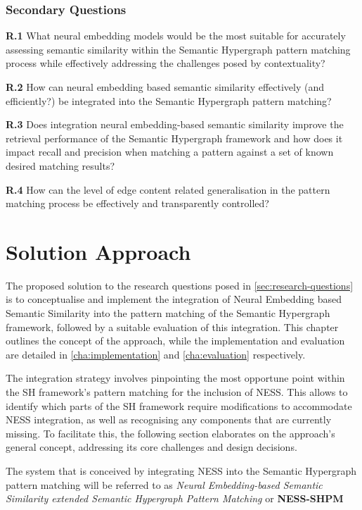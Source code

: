 \documentclass[11pt]{scrreprt}
\begin{document}
\subsection{Secondary Questions}
\textbf{R.1} What neural embedding models would be the most suitable for accurately assessing semantic similarity within the Semantic Hypergraph pattern matching process while effectively addressing the challenges posed by contextuality?

\textbf{R.2} How can neural embedding based semantic similarity effectively (and efficiently?) be integrated into the Semantic Hypergraph pattern matching?

\textbf{R.3} Does integration neural embedding-based semantic similarity improve the retrieval performance of the Semantic Hypergraph framework and how does it impact recall and precision when matching a pattern against a set of known desired matching results?

\textbf{R.4} How can the level of edge content related generalisation in the pattern matching process be effectively and transparently controlled?




\chapter{Solution Approach}
\label{cha:solution-approach}
The proposed solution to the research questions posed in \cref{sec:research-questions} is to conceptualise and implement the integration of Neural Embedding based Semantic Similarity into the pattern matching of the Semantic Hypergraph framework, followed by a suitable evaluation of this integration. This chapter outlines the concept of the approach, while the implementation and evaluation are detailed in \cref{cha:implementation} and \cref{cha:evaluation} respectively.

The integration strategy involves pinpointing the most opportune point within the SH framework's pattern matching for the inclusion of NESS. This  allows to identify which parts of the SH framework require modifications to accommodate NESS integration, as well as recognising any components that are currently missing. To facilitate this, the following section elaborates on the approach's general concept, addressing its core challenges and design decisions. 

The system that is conceived by integrating NESS into the Semantic Hypergraph pattern matching will be  referred to as \textit{Neural Embedding-based Semantic Similarity extended Semantic Hypergraph Pattern Matching} or {\textbf{NESS-SHPM}}
\end{document}
